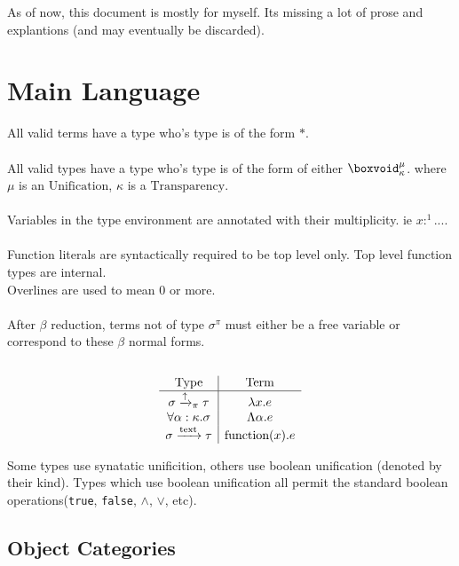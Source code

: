 \documentclass {article}
\begin{document}
As of now, this document is mostly for myself. Its missing a lot of prose and explantions (and may eventually be discarded). \\

\tableofcontents


\section{Main Language}
All valid terms have a type who's type is of the form $ * $. \\
\\
All valid types have a type who's type is of the form of either $ \boxvoid^\mu_\kappa $.
where $ \mu $ is an $ \text{Unification} $, $ \kappa $ is a $ \text{Transparency} $. \\
\\
Variables in the type environment are annotated with their multiplicity. ie $ x :^1 ... $. \\
\\
Function literals are syntactically required to be top level only. Top level function types are internal.
\\
Overlines are used to mean 0 or more. \\
\\
After $ \beta $ reduction, terms not of type $ \sigma^\pi $ must either be a free variable or correspond to these $ \beta $ normal forms. \\
\\
\begin{gather*}
\begin{array}{c | c}
\text{Type} & \text{Term} \\
\hline
\sigma \xrightarrow{\uparrow}_\pi \tau & \lambda x. e \\
\forall \alpha : \kappa. \sigma & \Lambda \alpha. e  \\
\sigma \xrightarrow{\text{text}} \tau & \text{function}(x). e \\
\end{array}
\end{gather*} 

Some types use synatatic unificition, others use boolean unification (denoted by their kind).
Types which use boolean unification all permit the standard boolean operations(\texttt{true}, \texttt{false}, $\land$, $\lor$, etc).


\subsection{Object Categories}
\end{document}
